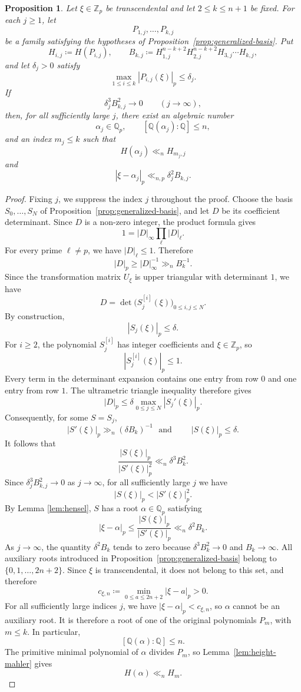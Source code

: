 \documentclass[10pt,a4paper]{amsart}
\newtheorem{proposition}[theorem]{Proposition}
\newcommand{\Q}{\mathbb Q}
\newcommand{\Qp}{\mathbb Q_p}
\newcommand{\Zp}{\mathbb Z_p}
\begin{document}
\begin{proposition}\label{prop:local-resultant}
Let $\xi\in\Zp$ be transcendental and let $2\leq k\leq n+1$ be fixed. For
each $j\geq1$, let
$$
P_{1,j},\ldots,P_{k,j}
$$
be a family satisfying the hypotheses of
Proposition~\ref{prop:generalized-basis}. Put
$$
H_{i,j}\coloneqq H(P_{i,j}),
\qquad
B_{k,j}\coloneqq
H_{1,j}^{n-k+2}H_{2,j}^{n-k+2}H_{3,j}\cdots H_{k,j},
$$
and let $\delta_j>0$ satisfy
$$
\max_{1\leq i\leq k}|P_{i,j}(\xi)|_p\leq\delta_j.
$$
If
$$
\delta_j^3B_{k,j}^2\longrightarrow0
\qquad(j\to\infty),
$$
then, for all sufficiently large $j$, there exist an algebraic number
$$
\alpha_j\in\Qp,
\qquad [\Q(\alpha_j):\Q]\leq n,
$$
and an index $m_j\leq k$ such that
$$
H(\alpha_j)\ll_n H_{m_j,j}
$$
and
$$
|\xi-\alpha_j|_p\ll_{n,p}\delta_j^2B_{k,j}.
$$
\end{proposition}

\begin{proof}
Fixing $j$, we suppress the index $j$ throughout the proof.
Choose the basis $S_0,\ldots,S_N$ of Proposition~\ref{prop:generalized-basis}, and let $D$ be its coefficient determinant. Since $D$ is a non-zero integer, the product formula gives
$$
1=|D|_\infty\prod_\ell|D|_\ell.
$$
For every prime $\ell\neq p$, we have $|D|_\ell\leq1$. Therefore
$$
|D|_p\geq|D|_\infty^{-1}\gg_n B_k^{-1}.
$$
Since the transformation matrix $U_\xi$ is upper triangular with determinant
$1$, we have
$$
D=\det\bigl(S_j^{[i]}(\xi)\bigr)_{0\leq i,j\leq N}.
$$
By construction,
$$
|S_j(\xi)|_p\leq\delta.
$$
For $i\geq2$, the polynomial $S_j^{[i]}$ has integer coefficients and $\xi\in\Zp$, so
$$
|S_j^{[i]}(\xi)|_p\leq1.
$$
Every term in the determinant expansion contains one entry from row $0$ and one entry from row $1$. The ultrametric triangle inequality therefore gives
$$
|D|_p
\leq
\delta\max_{0\leq j\leq N}|S_j'(\xi)|_p.
$$
Consequently, for some $S=S_j$,
$$
|S'(\xi)|_p\gg_n(\delta B_k)^{-1}\,\,\,\, \text{and}\,\,
\qquad |S(\xi)|_p\leq\delta.
$$
It follows that
$$
\frac{|S(\xi)|_p}{|S'(\xi)|_p^2}
\ll_n \delta^3B_k^2.
$$
Since $\delta_j^3B_{k,j}^2\to0$ as $j\to\infty$, for all sufficiently large
$j$ we have
$$
|S(\xi)|_p<|S'(\xi)|_p^2.
$$
By Lemma \ref{lem:hensel}, $S$ has a root $\alpha\in\Qp$ satisfying
$$
|\xi-\alpha|_p
\leq\frac{|S(\xi)|_p}{|S'(\xi)|_p}
\ll_n\delta^2B_k.
$$
As $j\to\infty$, the quantity $\delta^2B_k$ tends to zero because  $\delta^3B_k^2\longrightarrow0$ and $B_k\longrightarrow \infty$.
All auxiliary roots introduced in Proposition~\ref{prop:generalized-basis}
belong to $\{0,1,\ldots,2n+2\}$. Since $\xi$ is transcendental, it does not
belong to this set, and therefore
$$
c_{\xi,n}
\coloneqq
\min_{0\leq a\leq2n+2}|\xi-a|_p
>0.
$$
For all sufficiently large indices $j$, we have
$|\xi-\alpha|_p<c_{\xi,n}$, so $\alpha$ cannot be an auxiliary root. It is
therefore a root of one of the original polynomials $P_m$, with $m\leq k$.
In particular,
$$
[\Q(\alpha):\Q]\leq n.
$$
The primitive minimal polynomial of $\alpha$ divides $P_m$, so Lemma~\ref{lem:height-mahler} gives
$$
H(\alpha)\ll_nH_m.
$$
\end{proof}
\end{document}
